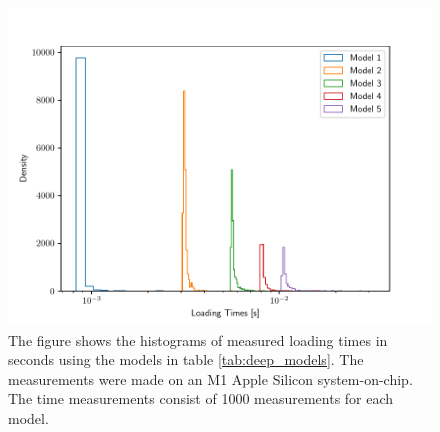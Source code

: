 \begin{figure}[h!]
    \centering
    \includegraphics[scale=0.7]{figures/computational_cost/loading_times.pdf}
    \caption{
        The figure shows the histograms of measured loading times in seconds using the models in table \ref{tab:deep_models}. The measurements were made on an M1 Apple Silicon system-on-chip. The time measurements consist of 1000 measurements for each model.
    }
    \label{fig:loading_times}
\end{figure}



